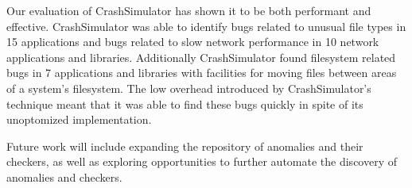 Our evaluation of CrashSimulator has shown it to be both performant and
effective.  CrashSimulator was able to identify bugs related to unusual file
types in 15 applications and bugs related to slow network performance in 10
network applications and libraries.  Additionally CrashSimulator found
filesystem related bugs in 7 applications and libraries with facilities for
moving files between areas of a system's filesystem.  The low overhead
introduced by CrashSimulator's technique meant that it was able to
find these bugs quickly in spite of its unoptomized implementation.

Future work will include expanding the repository of anomalies and their checkers, as well as exploring opportunities to further automate the discovery of anomalies and checkers.

